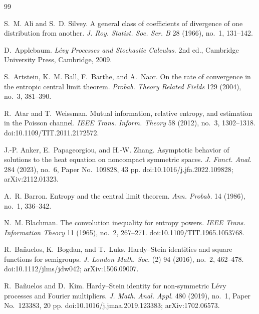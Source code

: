 \documentclass[11pt,reqno]{amsart}
\theoremstyle{plain}
\theoremstyle{definition}
\numberwithin{equation}{section}
\begin{document}
\appendix



\begin{thebibliography}{99}

S.~M. Ali and S.~D. Silvey.
\newblock A general class of coefficients of divergence of one distribution
from another.
\newblock \emph{J. Roy. Statist. Soc. Ser. B} 28 (1966), no.~1, 131--142.

D.~Applebaum.
\newblock \emph{L{\'e}vy Processes and Stochastic Calculus}.
\newblock 2nd ed., Cambridge University Press, Cambridge, 2009.

S.~Artstein, K.~M. Ball, F.~Barthe, and A.~Naor.
\newblock On the rate of convergence in the entropic central limit theorem.
\newblock \emph{Probab. Theory Related Fields} 129 (2004), no.~3, 381--390.

R.~Atar and T.~Weissman.
\newblock Mutual information, relative entropy, and estimation in the Poisson
channel.
\newblock \emph{IEEE Trans. Inform. Theory} 58 (2012), no.~3, 1302--1318.
\newblock doi:10.1109/TIT.2011.2172572.

J.-P. Anker, E.~Papageorgiou, and H.-W. Zhang.
\newblock Asymptotic behavior of solutions to the heat equation on noncompact
symmetric spaces.
\newblock \emph{J. Funct. Anal.} 284 (2023), no.~6, Paper No.~109828,
43 pp.
\newblock doi:10.1016/j.jfa.2022.109828; arXiv:2112.01323.

A.~R. Barron.
\newblock Entropy and the central limit theorem.
\newblock \emph{Ann. Probab.} 14 (1986), no.~1, 336--342.

N.~M. Blachman.
\newblock The convolution inequality for entropy powers.
\newblock \emph{IEEE Trans. Information Theory} 11 (1965), no.~2, 267--271.
\newblock doi:10.1109/TIT.1965.1053768.

R.~Ba{\~n}uelos, K.~Bogdan, and T.~Luks.
\newblock Hardy--Stein identities and square functions for semigroups.
\newblock \emph{J. London Math. Soc.} (2) 94 (2016), no.~2, 462--478.
\newblock doi:10.1112/jlms/jdw042; arXiv:1506.09007.

R.~Ba{\~n}uelos and D.~Kim.
\newblock Hardy--Stein identity for non-symmetric L{\'e}vy processes and
Fourier multipliers.
\newblock \emph{J. Math. Anal. Appl.} 480 (2019), no.~1, Paper No.~123383,
20 pp.
\newblock doi:10.1016/j.jmaa.2019.123383; arXiv:1702.06573.


\end{thebibliography}
\end{document}
